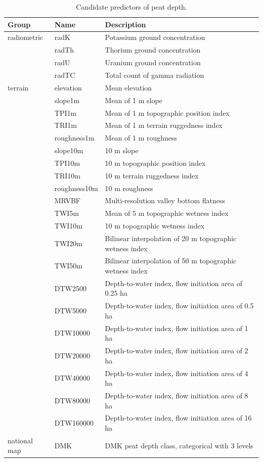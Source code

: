 \documentclass[soil, manuscript]{copernicus}
\begin{document}
\begin{table}

\caption{\label{tab:preds}Candidate predictors of peat depth.}
\centering
\begin{tabular}[t]{lll}
\hline
Group & Name & Description\\
\hline
radiometric & radK & Potassium ground concentration\\
 & radTh & Thorium ground concentration\\
 & radU & Uranium ground concentration\\
 & radTC & Total count of gamma radiation\\
terrain & elevation & Mean elevation\\
 & slope1m & Mean of 1 m slope\\
 & TPI1m & Mean of 1 m topographic position index\\
 & TRI1m & Mean of 1 m terrain ruggedness index\\
 & roughness1m & Mean of 1 m roughness\\
 & slope10m & 10 m slope\\
 & TPI10m & 10 m topographic position index\\
 & TRI10m & 10 m terrain ruggedness index\\
 & roughness10m & 10 m roughness\\
 & MRVBF & Multi-resolution valley bottom flatness\\
 & TWI5m & Mean of 5 m topographic wetness index\\
 & TWI10m & 10 m topographic wetness index\\
 & TWI20m & Bilinear interpolation of 20 m topographic wetness index\\
 & TWI50m & Bilinear interpolation of 50 m topographic wetness index\\
 & DTW2500 & Depth-to-water index, flow initiation area of 0.25 ha\\
 & DTW5000 & Depth-to-water index, flow initiation area of 0.5 ha\\
 & DTW10000 & Depth-to-water index, flow initiation area of 1 ha\\
 & DTW20000 & Depth-to-water index, flow initiation area of 2 ha\\
 & DTW40000 & Depth-to-water index, flow initiation area of 4 ha\\
 & DTW80000 & Depth-to-water index, flow initiation area of 8 ha\\
 & DTW160000 & Depth-to-water index, flow initiation area of 16 ha\\
national map & DMK & DMK peat depth class, categorical with 3 levels\\
\hline
\end{tabular}
\end{table}
\end{document}
